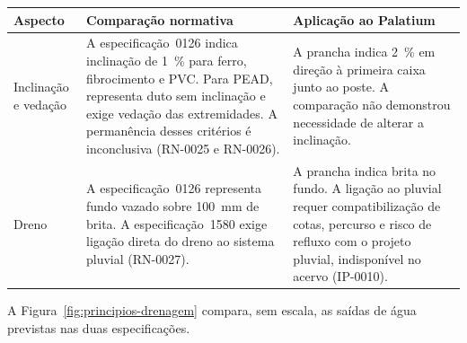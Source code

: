 \par\noindent
\begin{minipage}{\linewidth}
\centering
{}\label{qua:drenos-palatium}
{\small\setlength{\tabcolsep}{4pt}\renewcommand{\arraystretch}{1.15}
\begin{tabular}{|>{\raggedright\arraybackslash}p{.17\linewidth}|>{\raggedright\arraybackslash}p{.38\linewidth}|>{\raggedright\arraybackslash}p{.37\linewidth}|}\hline
\textbf{Aspecto} & \textbf{Comparação normativa} & \textbf{Aplicação ao Palatium} \\\hline
Inclinação e vedação & A especificação~0126 indica inclinação de 1~\% para ferro, fibrocimento e PVC. Para PEAD, representa duto sem inclinação e exige vedação das extremidades. A permanência desses critérios é inconclusiva (RN-0025 e RN-0026). & A prancha indica 2~\% em direção à primeira caixa junto ao poste. A comparação não demonstrou necessidade de alterar a inclinação. \\\hline
Dreno & A especificação~0126 representa fundo vazado sobre 100~mm de brita. A especificação~1580 exige ligação direta do dreno ao sistema pluvial (RN-0027). & A prancha indica brita no fundo. A ligação ao pluvial requer compatibilização de cotas, percurso e risco de refluxo com o projeto pluvial, indisponível no acervo (IP-0010). \\\hline
\end{tabular}}
\end{minipage}\par

A Figura~\ref{fig:principios-drenagem} compara, sem escala, as saídas de água previstas nas duas especificações.

\par\noindent
\begin{minipage}{\linewidth}
  \label{fig:principios-drenagem}
  \vspace{0.7\baselineskip}
  {\centering
  \par}
\end{minipage}
\par

